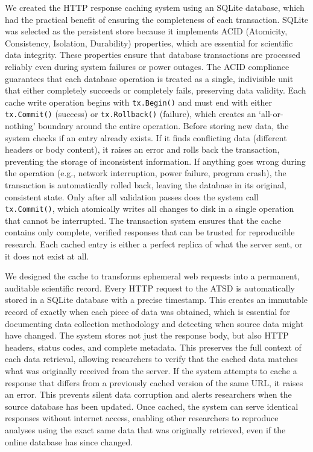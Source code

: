 \documentclass[12pt]{article}
\begin{document}
We created the HTTP response caching system using an SQLite database,
which had the practical benefit of ensuring the completeness of each transaction.
SQLite was selected as the persistent store because it implements ACID 
(Atomicity, Consistency, Isolation, Durability) properties, 
which are essential for scientific data integrity. 
These properties ensure that database transactions are processed reliably 
even during system failures or power outages. 
The ACID compliance guarantees that each database operation is treated as a single, indivisible unit
that either completely succeeds or completely fails, preserving data validity.
Each cache write operation begins with {\tt tx.Begin()} and must end with either
{\tt tx.Commit()} (success) or {\tt tx.Rollback()} (failure),
which creates an `all-or-nothing' boundary around the entire operation.
Before storing new data, 
the system checks if an entry already exists. 
If it finds conflicting data (different headers or body content), it raises an error and rolls back the transaction, 
preventing the storage of inconsistent information.
If anything goes wrong during the operation (e.g., network interruption, power failure, program crash),
the transaction is automatically rolled back, leaving the database in its original, consistent state.
Only after all validation passes does the system call {\tt tx.Commit()}, 
which atomically writes all changes to disk in a single operation that cannot be interrupted.
The transaction system ensures that the cache contains only complete, 
verified responses that can be trusted for reproducible research.
Each cached entry is either a perfect replica of what the server sent,
or it does not exist at all.

We designed the cache to 
transforms ephemeral web requests into a permanent, auditable scientific record.
Every HTTP request to the ATSD is automatically stored in a SQLite database with a precise timestamp.
This creates an immutable record of exactly when each piece of data was obtained, 
which is essential for documenting data collection methodology and detecting when source data might have changed.
The system stores not just the response body, but also HTTP headers, status codes, and complete metadata. 
This preserves the full context of each data retrieval, 
allowing researchers to verify that the cached data matches what was originally received from the server.
If the system attempts to cache a response that differs from a previously cached version of the same URL, 
it raises an error.
This prevents silent data corruption and alerts researchers when the source database has been updated.
Once cached, the system can serve identical responses without internet access,
enabling other researchers to reproduce analyses using the exact same data that was originally retrieved,
even if the online database has since changed.
\end{document}
